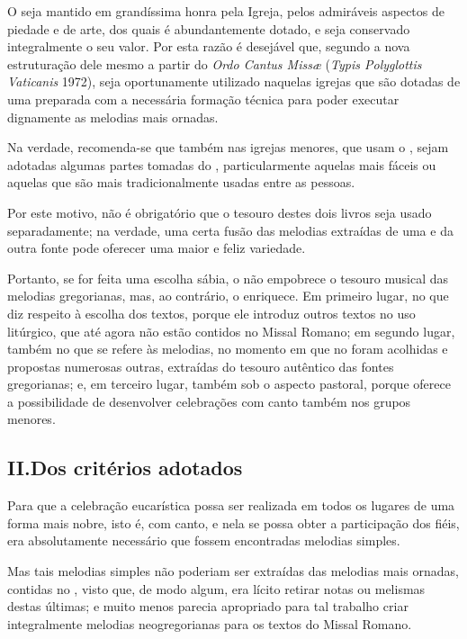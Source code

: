  O {\GR} seja mantido em grandíssima honra pela Igreja, pelos admiráveis aspectos de piedade e de arte, dos quais é abundantemente dotado, e seja conservado integralmente o seu valor. Por esta razão é desejável que, segundo a nova estruturação dele mesmo a partir do \emph{Ordo Cantus Missæ} (\emph{Typis Polyglottis Vaticanis} 1972), seja oportunamente utilizado naquelas igrejas que são dotadas de uma {\ScholaC} preparada com a necessária formação técnica para poder executar dignamente as melodias mais ornadas.

Na verdade, recomenda-se que também nas igrejas menores, que usam o {\GS}, sejam  adotadas algumas partes tomadas do {\GR}, particularmente aquelas mais fáceis ou aquelas que são mais tradicionalmente usadas entre as pessoas.

 Por este motivo, não é obrigatório que o tesouro destes dois livros seja usado separadamente; na verdade, uma certa fusão das melodias extraídas de uma e da outra fonte pode oferecer uma maior e feliz variedade.

 Portanto, se for feita uma escolha sábia, o {\GS} não empobrece o tesouro musical das melodias gregorianas, mas, ao contrário, o enriquece. Em primeiro lugar, no que diz respeito à escolha dos textos, porque ele introduz outros textos no uso litúrgico, que até agora não estão contidos no Missal Romano; em segundo lugar, também no que se refere às melodias, no momento em que no {\GS} foram acolhidas e propostas numerosas outras, extraídas do tesouro autêntico das fontes gregorianas; e, em terceiro lugar, também sob o aspecto pastoral, porque oferece a possibilidade de desenvolver celebrações com canto também nos grupos menores.

\subsection*{II.\@ Dos critérios adotados}\label{subsection*:praenotanda-2}

 Para que a celebração eucarística possa ser realizada em todos os lugares de uma forma mais nobre, isto é, com canto, e nela se possa obter a participação dos fiéis, era absolutamente necessário que fossem encontradas melodias simples.

 Mas tais melodias simples não poderiam ser extraídas das melodias mais ornadas, contidas no {\GR}, visto que, de modo algum, era lícito retirar notas ou melismas destas últimas; e muito menos parecia apropriado para tal trabalho criar integralmente melodias neogregorianas para os textos do Missal Romano.

